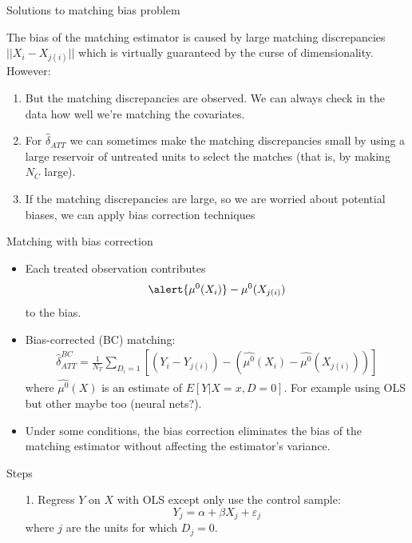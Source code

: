\documentclass{beamer}
\begin{document}
\begin{frame}{Solutions to matching bias problem}
	
The bias of the matching estimator is caused by large matching discrepancies $||X_i - X_{j(i)}||$ which is virtually guaranteed by the curse of dimensionality.  However:
	\begin{enumerate}
	\item But the matching discrepancies are observed. We can always check in the data how well we're matching the covariates.

	\item For $\widehat{\delta}_{ATT}$ we can sometimes make the matching discrepancies small by using a large reservoir of untreated units to select the matches (that is, by making $N_C$ large).

  \item If the matching discrepancies are large, so we are worried about potential biases, we can apply bias correction techniques

	\end{enumerate}
\end{frame}

 
\begin{frame}{Matching with bias correction}
	
	\begin{itemize}
	\item Each treated observation contributes$$\alert{\mu^0(X_i)} - \mu^0(X_{j(i)})$$to the bias.
	\item Bias-corrected (BC) matching:
		\begin{eqnarray*}
		\widehat{\delta}_{ATT}^{BC} = \frac{1}{N_T} \sum_{D_i=1} \left[ (Y_i - Y_{j(i)}) - ( \widehat{\mu^0}(X_i) - \widehat{\mu^0}(X_{j(i)}) ) \right]
		\end{eqnarray*}where $\widehat{\mu^0}(X)$ is an estimate of $E[Y|X=x,D=0]$.  For example using OLS but other maybe too (neural nets?).  
	\item Under some conditions, the bias correction eliminates the bias of the matching estimator without affecting the estimator's variance.
	\end{itemize}
\end{frame}


\begin{frame}{Steps}

\begin{enumerate}
\item[1.  ]Regress $Y$ on $X$ with OLS except only use the control sample:
\begin{equation}
Y_j = \alpha + \beta X_j + \varepsilon_j \nonumber
\end{equation}where $j$ are the units for which $D_j=0$.  
\end{enumerate}

\end{frame}
\end{document}
